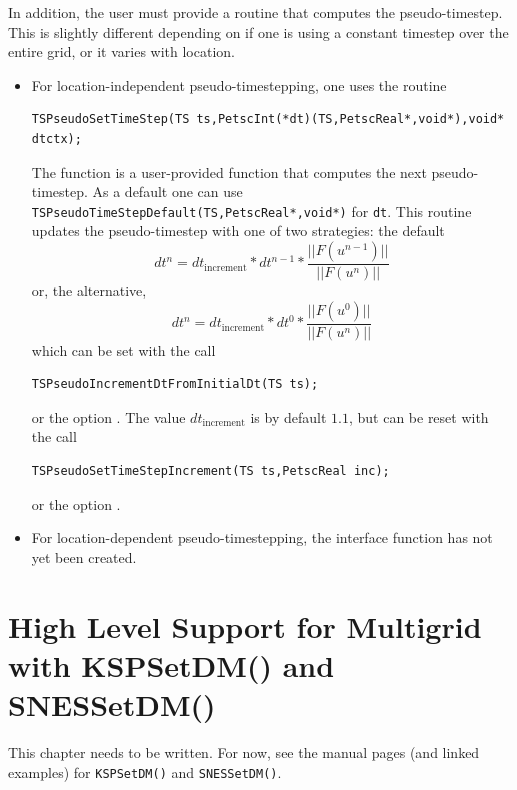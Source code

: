 {In addition, the user must provide a routine that computes the
pseudo-timestep. This is slightly different depending on if
one is using a constant timestep over the entire grid, or it varies
with location.
\begin{itemize}
\item For location-independent pseudo-timestepping, one uses the routine
\begin{lstlisting}
TSPseudoSetTimeStep(TS ts,PetscInt(*dt)(TS,PetscReal*,void*),void* dtctx);
\end{lstlisting}
The function  is a user-provided function that computes the next
pseudo-timestep. As a default one can use
\lstinline{TSPseudoTimeStepDefault(TS,PetscReal*,void*)} for \lstinline{dt}. This routine
updates the pseudo-timestep with one of two strategies: the default
\[
   dt^{n} = dt_{\mathrm{increment}}*dt^{n-1}*\frac{|| F(u^{n-1}) ||}{|| F(u^{n})||}
\]
or, the alternative,
\[
   dt^{n} = dt_{\mathrm{increment}}*dt^{0}*\frac{|| F(u^{0}) ||}{|| F(u^{n})||}
\]
which can be set with the call
\begin{lstlisting}
TSPseudoIncrementDtFromInitialDt(TS ts);
\end{lstlisting}
or
the option .
The value $ dt_{\mathrm{increment}} $ is by default $ 1.1$, but can be reset with the
call
\begin{lstlisting}
TSPseudoSetTimeStepIncrement(TS ts,PetscReal inc);
\end{lstlisting}
or  the option
. 


\item For location-dependent pseudo-timestepping, the interface function
      has not yet been created.
\end{itemize}

\cleardoublepage
\chapter{High Level Support for Multigrid with KSPSetDM() and SNESSetDM()}
\label{chapter_kspdm}

This chapter needs to be written. For now, see the manual pages (and linked examples) for \lstinline{KSPSetDM()} and \lstinline{SNESSetDM()}.

\cleardoublepage
}
